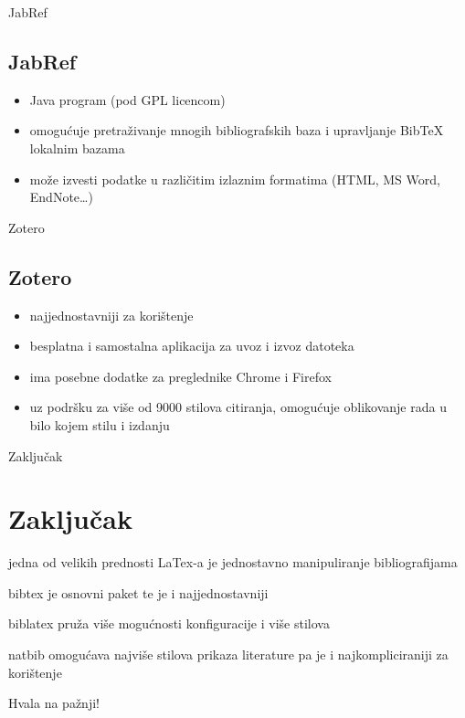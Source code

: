 \documentclass{beamer}
\begin{document}
 

\begin{frame}{JabRef}
\subsection{JabRef}
\begin{itemize}
	\item Java program (pod GPL licencom) \\
	\item omogućuje pretraživanje mnogih bibliografskih baza i upravljanje
	BibTeX lokalnim bazama  \\
	\item može izvesti podatke u različitim izlaznim formatima (HTML, MS Word, EndNote…) \\
\end{itemize}
 \end{frame}

 
\begin{frame}{Zotero}
\subsection{Zotero}
\begin{itemize}
	\item najjednostavniji za korištenje  \\
	\item besplatna i samostalna aplikacija za uvoz i izvoz datoteka \\
	\item ima posebne dodatke za preglednike Chrome i Firefox \\
	\item uz podršku za više od 9000 stilova citiranja, omogućuje oblikovanje
	 rada u bilo kojem stilu i izdanju \\
\end{itemize}
 \end{frame}


\begin{frame}{Zaključak}
\section{Zaključak}
	\item jedna od velikih prednosti LaTex-a je jednostavno manipuliranje bibliografijama \\
	\item bibtex je osnovni paket te je i najjednostavniji \\
	\item biblatex pruža više mogućnosti konfiguracije i više stilova \\
	\item natbib omogućava najviše stilova prikaza literature pa je i najkompliciraniji za korištenje \\
\end{frame}

\begin{frame}
\printbibliography[title={Literatura}]
\end{frame}

\begin{frame}
Hvala na pažnji!
\end{frame}
\end{document}
